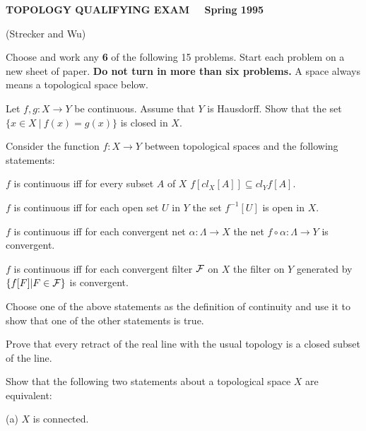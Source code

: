 \documentclass[12pt]{article}
\begin{document}
 \begin{center}

 {\bf TOPOLOGY QUALIFYING EXAM \ \ Spring 1995}

	(Strecker and Wu)

 \end{center}


 Choose and work any {\bf 6} of the following 15 problems. Start each
  problem on a new sheet of paper. {\bf Do not turn in more than six
  problems.}
 A space always means a topological space below.

\vspace{10pt}
Let $f, g:X\rightarrow Y$ be continuous. Assume that $Y$ is Hausdorff.
Show that the set$\{ x\in X\ | \ f(x)=g(x) \}$ is closed in $X$.

\vspace{10pt}

Consider the function $f: X\rightarrow Y$ between topological spaces
and the following statements:

  $f$ is continuous iff for every subset $A$ of $X$
$f[cl_X[A]] \subseteq cl_Yf[A]$.

  $f$ is continuous iff for each open set $U$ in $Y$
the set $f^{-1}[U]$ is open in $X$.

  $f$ is continuous iff for each convergent net
$\alpha : \Lambda\rightarrow X$ the net $f\circ \alpha : \Lambda\rightarrow Y$
 is convergent.

  $f$ is continuous iff for each convergent
filter $\cal F$ on $X$ the filter on $Y$ generated by $\{f[F] | F \in \cal F\}$
is convergent.

\vspace{10pt}

Choose one of the above statements as the definition of continuity and use it to
show that one of the other statements is true.

\vspace{10pt}

Prove that every retract of the real line with the usual topology is a closed
subset of the line.

\vspace{10pt}

Show that the following two statements about a topological space $X$ are
equivalent:


(a) $X$  is connected.
\end{document}
